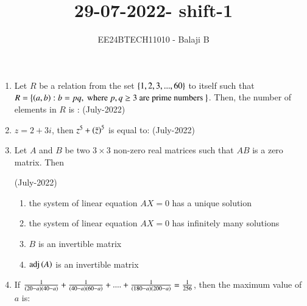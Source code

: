 \documentclass[journal]{IEEEtran}
\begin{document}

\vspace{3cm}

\title{29-07-2022- shift-1}
\author{EE24BTECH11010 - Balaji B}
{\let\newpage\relax\maketitle}
\begin{enumerate}
    \item Let $R$ be a relation from the set $\left\{1,2,3,...,60\right\}$
 to itself such that $R = \left\{\left(a,b\right) : b = pq, \text{ where } p, q \ge 3 \text{ are prime numbers }\right\}$. Then, the  number of elements in $R$ is : \hfill (July-2022)
 \begin{enumerate}
 \end{enumerate}
 \item $z = 2 + 3i$, then $z^5 + \left(\bar{z}\right)^5$ is equal to: \hfill (July-2022)
 \begin{enumerate}
 \end{enumerate}
 \item Let $A$ and $B$ be two $3 \times 3$
 non-zero real matrices such that $AB$ is a zero matrix. Then

 \hfill(July-2022)
 \begin{enumerate}
     
         \item the system of linear equation $AX = 0$ has a unique solution
         \item the system of linear equation $AX = 0$ has infinitely many solutions
         \item $B$ is an invertible matrix
	 \item $\operatorname{adj} \left(A\right)$ is an invertible matrix 
 \end{enumerate}
 \item If $\frac{1}{\left(20-a\right)\left(40-a\right)} + \frac{1}{\left(40-a\right)\left(60-a\right)} + . . . . + \frac{1}{\left(180-a\right)\left(200-a\right)} = \frac{1}{256}$, then the maximum value of $a$ is:


\end{enumerate}
\end{document}
